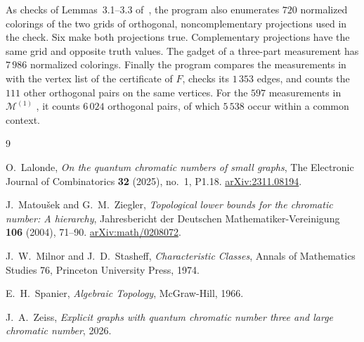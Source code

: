 \documentclass[11pt,a4paper]{article}
\begin{document}
As checks of Lemmas~3.1--3.3 of~\cite{Z}, the program also enumerates
$720$ normalized colorings of the two grids of orthogonal,
noncomplementary projections used in the check. Six make both projections
true. Complementary projections have the same grid and opposite truth
values. The gadget of a three-part measurement has $7\,986$ normalized
colorings. Finally the program compares the measurements
in~\cite[Corollary~3.5]{Z} with the vertex list of the certificate of
$F$, checks its $1\,353$ edges, and counts the $111$ other orthogonal
pairs on the same vertices. For the $597$ measurements in
$\mathcal M^{(1)}$ \cite[Section~4.5]{Z}, it counts $6\,024$ orthogonal
pairs, of which $5\,538$ occur within a common context.

\begin{thebibliography}{9}

O.~Lalonde,
\emph{On the quantum chromatic numbers of small graphs},
The Electronic Journal of Combinatorics \textbf{32} (2025), no.~1, P1.18.
\href{https://arxiv.org/abs/2311.08194}{arXiv:2311.08194}.

J.~Matou\v{s}ek and G.~M.~Ziegler,
\emph{Topological lower bounds for the chromatic number: A hierarchy},
Jahresbericht der Deutschen Mathematiker-Vereinigung \textbf{106} (2004),
71--90.
\href{https://arxiv.org/abs/math/0208072}{arXiv:math/0208072}.

J.~W.~Milnor and J.~D.~Stasheff,
\emph{Characteristic Classes},
Annals of Mathematics Studies 76, Princeton University Press, 1974.

E.~H.~Spanier,
\emph{Algebraic Topology},
McGraw-Hill, 1966.

J.~A.~Zeiss,
\emph{Explicit graphs with quantum chromatic number three and large
chromatic number}, 2026.

\end{thebibliography}
\end{document}
